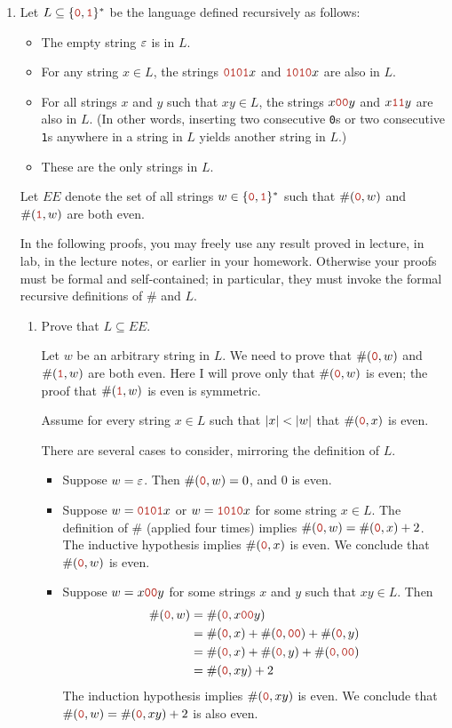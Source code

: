 \documentclass[11pt]{article}
\def\Sym#1{\texttt{\color{BrickRed}#1}}
\begin{document}
\begin{enumerate}
\newpage
\item
Let $L \subseteq \set{\Sym0, \Sym1}^*$ be the language defined recursively as follows:
\begin{itemize}
\item
The empty string $\varepsilon$ is in $L$.
\item
For any string $x\in L$, the strings $\Sym{0101}x$ and $\Sym{1010}x$ are also in $L$.
\item
For all strings $x$ and $y$ such that $xy \in L$, the strings $x\Sym{00}y$ and $x\Sym{11}y$ are also in $L$.  (In other words, inserting two consecutive \Sym0s or two consecutive \Sym1s anywhere in a string in $L$ yields another string in $L$.)
\item
These are the only strings in $L$.
\end{itemize}

Let $EE$ denote the set of all strings $w \in \set{\Sym0, \Sym1}^*$ such that $\#(\Sym0,w)$ and $\#(\Sym1,w)$ are both even.

In the following proofs, you may freely use any result proved in lecture, in lab, in the lecture notes, or earlier in your homework.  Otherwise your proofs must be formal and self-contained; in particular, they must invoke the formal recursive definitions of $\#$ and $L$.


\begin{enumerate}
\item Prove that $L \subseteq EE$.

\begin{Solution}
Let $w$ be an arbitrary string in $L$.  We need to prove that $\#(\Sym0,w)$ and $\#(\Sym1,w)$ are both even.  Here I will prove only that $\#(\Sym0,w)$ is even; the proof that $\#(\Sym1,w)$ is even is symmetric.

Assume for every string $x\in L$ such that $\mathopen| x \mathclose|<\mathopen| w \mathclose|$ that $\#(\Sym0,x)$ is even.

There are several cases to consider, mirroring the definition of $L$.

\begin{itemize}
\item
Suppose $w = \varepsilon$.  Then $\#(\Sym0,w) = 0$, and $0$ is even.
\item
Suppose $w = \Sym{0101}x$ or $w = \Sym{1010}x$ for some string $x\in L$.  The  definition of $\#$ (applied four times) implies $\#(\Sym0, w) = \#(\Sym0, x) + 2$.  The inductive hypothesis implies $\#(\Sym0, x)$ is even.  We conclude that $\#(\Sym0, w)$ is even.

\item
Suppose $w = x\Sym{00}y$ for some strings $x$ and $y$ such that $xy\in L$.  Then
\begin{align*}
	\#(\Sym0, w) 
	&=
	\#(\Sym0, x\Sym{00}y) \\
	&=
	\#(\Sym0, x) + \#(\Sym0, \Sym{00}) + \#(\Sym0, y) \\
	&=
	\#(\Sym0, x) + \#(\Sym0, y) + \#(\Sym0, \Sym{00}) \\
	&=
	\#(\Sym0, xy) + 2
\end{align*}
The induction hypothesis implies $\#(\Sym0, xy)$ is even.  We conclude that $\#(\Sym0, w) = \#(\Sym0, xy) + 2$ is also even.


\end{itemize}
\end{Solution}
\end{enumerate}
\end{enumerate}
\end{document}
